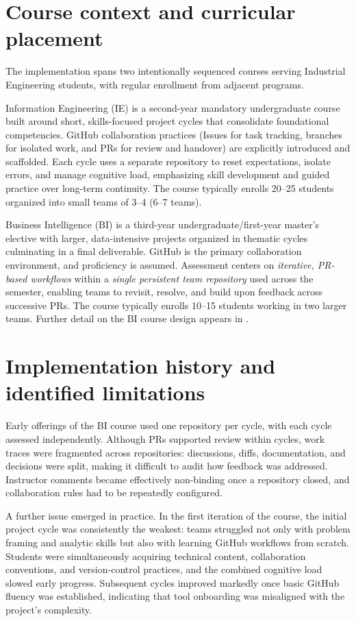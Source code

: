 \section{Course context and curricular placement}
The implementation spans two intentionally sequenced courses serving Industrial Engineering students, with regular enrollment from adjacent programs.

Information Engineering (IE) is a second-year mandatory undergraduate course built around short, skills-focused project cycles that consolidate foundational competencies. GitHub collaboration practices (Issues for task tracking, branches for isolated work, and PRs for review and handover) are explicitly introduced and scaffolded. Each cycle uses a separate repository to reset expectations, isolate errors, and manage cognitive load, emphasizing skill development and guided practice over long-term continuity. The course typically enrolls 20--25 students organized into small teams of 3--4 (6--7 teams).

Business Intelligence (BI) is a third-year undergraduate/first-year master's elective with larger, data-intensive projects organized in thematic cycles culminating in a final deliverable. GitHub is the primary collaboration environment, and proficiency is assumed. Assessment centers on \emph{iterative, PR-based workflows} within a \emph{single persistent team repository} used across the semester, enabling teams to revisit, resolve, and build upon feedback across successive PRs. The course typically enrolls 10--15 students working in two larger teams. Further detail on the BI course design appears in \textcite{Ingimundardottir2026Industry}.

\section{Implementation history and identified limitations}

Early offerings of the BI course used one repository per cycle, with each cycle assessed independently. Although PRs supported review within cycles, work traces were fragmented across repositories: discussions, diffs, documentation, and decisions were split, making it difficult to audit how feedback was addressed. Instructor comments became effectively non-binding once a repository closed, and collaboration rules had to be repeatedly configured.

A further issue emerged in practice. In the first iteration of the course, the initial project cycle was consistently the weakest: teams struggled not only with problem framing and analytic skills but also with learning GitHub workflows from scratch. Students were simultaneously acquiring technical content, collaboration conventions, and version-control practices, and the combined cognitive load slowed early progress. Subsequent cycles improved markedly once basic GitHub fluency was established, indicating that tool onboarding was misaligned with the project's complexity.

